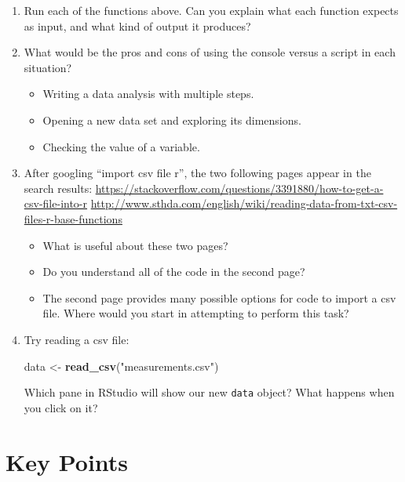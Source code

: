 \documentclass[]{Nemilov}
\newenvironment{Shaded}{\begin{snugshade}}{\end{snugshade}}
\newcommand{\KeywordTok}[1]{\textcolor[rgb]{0.13,0.29,0.53}{\textbf{#1}}}
\newcommand{\NormalTok}[1]{#1}
\newcommand{\StringTok}[1]{\textcolor[rgb]{0.31,0.60,0.02}{#1}}
\providecommand{\tightlist}{%
  \setlength{\itemsep}{0pt}\setlength{\parskip}{0pt}}
\begin{document}
\begin{enumerate}
\def\labelenumi{\arabic{enumi}.}
\item
  Run each of the functions above. Can you explain what each function
  expects as input, and what kind of output it produces?
\item
  What would be the pros and cons of using the console versus a script in each situation?

  \begin{itemize}
  \tightlist
  \item
    Writing a data analysis with multiple steps.
  \item
    Opening a new data set and exploring its dimensions.
  \item
    Checking the value of a variable.
  \end{itemize}
\item
  After googling ``import csv file r'', the two following pages appear in the
  search results:
  \url{https://stackoverflow.com/questions/3391880/how-to-get-a-csv-file-into-r}
  \url{http://www.sthda.com/english/wiki/reading-data-from-txt-csv-files-r-base-functions}

  \begin{itemize}
  \tightlist
  \item
    What is useful about these two pages?
  \item
    Do you understand all of the code in the second page?
  \item
    The second page provides many possible options for code to import a
    csv file. Where would you start in attempting to perform this task?
  \end{itemize}
\item
  Try reading a csv file:

\begin{Shaded}
\begin{Highlighting}[]
\NormalTok{data <-}\StringTok{ }\KeywordTok{read_csv}\NormalTok{(}\StringTok{"measurements.csv"}\NormalTok{)}
\end{Highlighting}
\end{Shaded}

  Which pane in RStudio will show our new \texttt{data} object?
  What happens when you click on it?
\end{enumerate}

\hypertarget{r-getting-started-keypoints}{%
\section{Key Points}\label{r-getting-started-keypoints}}
\end{document}
